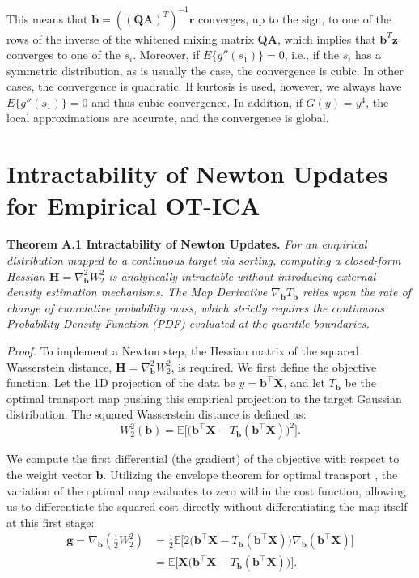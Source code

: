 \documentclass[12pt,a4paper,twoside,openany]{book}
\begin{document}
This means that $\mathbf{b} = ((\mathbf{Q}\mathbf{A})^T)^{-1}\mathbf{r}$ converges, up to the sign, to one of the rows of 
the inverse of the whitened mixing matrix $\mathbf{Q}\mathbf{A}$, which implies that $\mathbf{b}^T\mathbf{z}$ converges to one of the $s_i$. 
Moreover, if $E\{g''(s_1)\} = 0$, i.e., if the $s_i$ has a symmetric distribution, as is usually the case, the convergence is cubic. 
In other cases, the convergence is quadratic. If kurtosis is used, however, we always have $E\{g''(s_1)\} = 0$ and thus cubic convergence. 
In addition, if $G(y) = y^4$, the local approximations are accurate, and the convergence is global.

\section{Intractability of Newton Updates for Empirical OT-ICA}
\label{app:newton_intractable}

\noindent\textbf{Theorem A.1 Intractability of Newton Updates.} \textit{For an empirical distribution mapped to a continuous target via sorting, 
computing a closed-form Hessian $\mathbf{H} = \nabla^2_{\mathbf{b}} W_2^2$ is analytically intractable without introducing external density estimation mechanisms. 
The Map Derivative $\nabla_{\mathbf{b}} T_{\mathbf{b}}$ relies upon the rate of change of cumulative probability mass, 
which strictly requires the continuous Probability Density Function (PDF) evaluated at the quantile boundaries.}
\vspace{0.5em}

\textit{Proof.} To implement a Newton step, the Hessian matrix of the squared Wasserstein distance, $\mathbf{H} = \nabla^2_{\mathbf{b}} W_2^2$, is required. 
We first define the objective function. Let the 1D projection of the data be $y = \mathbf{b}^\top \mathbf{X}$, and let $T_{\mathbf{b}}$ be 
the optimal transport map pushing this empirical projection to the target Gaussian distribution. The squared Wasserstein distance is defined as:
\begin{equation}
    W_2^2(\mathbf{b}) = \mathbb{E}\Big[ \big( \mathbf{b}^\top \mathbf{X} - T_{\mathbf{b}}(\mathbf{b}^\top \mathbf{X}) \big)^2 \Big].
\end{equation}

We compute the first differential (the gradient) of the objective with respect to the weight vector $\mathbf{b}$. 
Utilizing the envelope theorem for optimal transport \cite[Section 7.2]{santambrogio2015optimal}, 
the variation of the optimal map evaluates to zero within the cost function, allowing us to differentiate 
the squared cost directly without differentiating the map itself at this first stage:
\begin{align}
    \mathbf{g} = \nabla_{\mathbf{b}} \left( \frac{1}{2} W_2^2 \right) &= \frac{1}{2} \mathbb{E}\Big[ 2 \big( \mathbf{b}^\top \mathbf{X} - T_{\mathbf{b}}(\mathbf{b}^\top \mathbf{X}) \big) \nabla_{\mathbf{b}} (\mathbf{b}^\top \mathbf{X}) \Big] \nonumber \\
    &= \mathbb{E}\Big[ \mathbf{X} \big( \mathbf{b}^\top \mathbf{X} - T_{\mathbf{b}}(\mathbf{b}^\top \mathbf{X}) \big) \Big].
\end{align}
\end{document}
